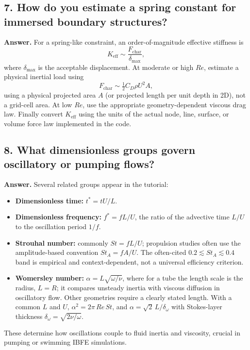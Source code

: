 \documentclass[12pt]{article}
\begin{document}
\subsection*{7. How do you estimate a spring constant for immersed boundary structures?}

\textbf{Answer.}
For a spring-like constraint, an order-of-magnitude effective stiffness is
\[
K_{\text{eff}} \sim \frac{F_{\text{char}}}{\delta_{\max}},
\]
where $\delta_{\max}$ is the acceptable displacement. At moderate or high
$Re$, estimate a physical inertial load using
\[
F_{\text{char}}\sim \tfrac12 C_D\rho U^2A,
\]
using a physical projected area $A$ (or projected length per unit depth in 2D),
not a grid-cell area. At low $Re$, use the appropriate geometry-dependent
viscous drag law. Finally convert $K_{\text{eff}}$ using the units of the actual
node, line, surface, or volume force law implemented in the code.

\subsection*{8. What dimensionless groups govern oscillatory or pumping flows?}

\textbf{Answer.}
Several related groups appear in the tutorial:
\begin{itemize}
    \item \textbf{Dimensionless time:} $t^*=tU/L$.
    \item \textbf{Dimensionless frequency:} $f^*=fL/U$, the ratio of the
          advective time $L/U$ to the oscillation period $1/f$.
    \item \textbf{Strouhal number:} commonly $St=fL/U$; propulsion studies often
          use the amplitude-based convention $St_A=fA/U$. The often-cited
          $0.2\lesssim St_A\lesssim0.4$ band is empirical and context-dependent,
          not a universal efficiency criterion.
    \item \textbf{Womersley number:} $\alpha=L\sqrt{\omega/\nu}$, where for a
          tube the length scale is the radius, $L=R$; it compares unsteady
          inertia with viscous diffusion in oscillatory flow. Other geometries
          require a clearly stated length. With a common $L$ and $U$,
          $\alpha^2=2\pi\,Re\,St$, and $\alpha=\sqrt2\,L/\delta_\omega$ with
          Stokes-layer thickness $\delta_\omega=\sqrt{2\nu/\omega}$.
\end{itemize}
These determine how oscillations couple to fluid inertia and viscosity, crucial
in pumping or swimming IBFE simulations.
\end{document}
